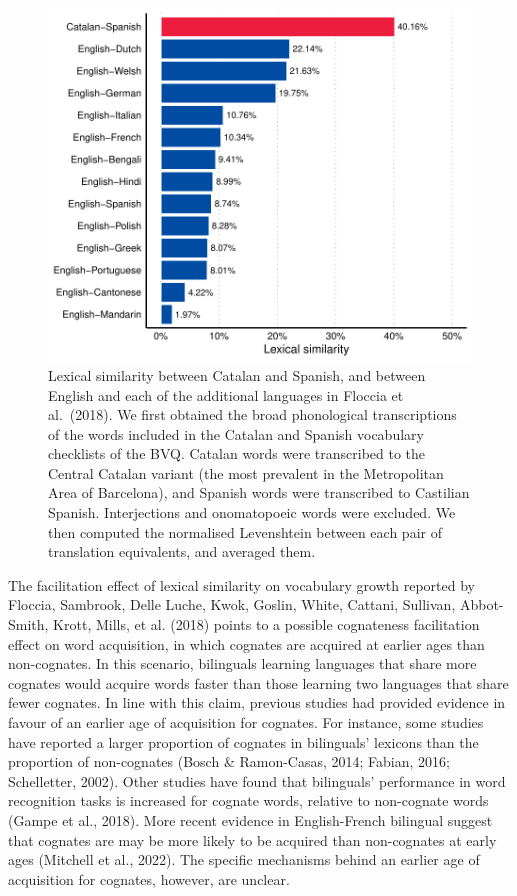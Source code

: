 \documentclass[
  12pt,
  b5paperpaper,
  twoside]{scrreprt}
\begin{document}
\begin{figure}

{\centering \includegraphics{chapters/01-introduction_files/figure-pdf/fig-cat-spa-distance-1.pdf}

}

\caption{\label{fig-cat-spa-distance}Lexical similarity between Catalan
and Spanish, and between English and each of the additional languages in
Floccia et al.~(2018). We first obtained the broad phonological
transcriptions of the words included in the Catalan and Spanish
vocabulary checklists of the BVQ. Catalan words were transcribed to the
Central Catalan variant (the most prevalent in the Metropolitan Area of
Barcelona), and Spanish words were transcribed to Castilian Spanish.
Interjections and onomatopoeic words were excluded. We then computed the
normalised Levenshtein between each pair of translation equivalents, and
averaged them.}

\end{figure}

The facilitation effect of lexical similarity on vocabulary growth
reported by Floccia, Sambrook, Delle Luche, Kwok, Goslin, White,
Cattani, Sullivan, Abbot-Smith, Krott, Mills, et al. (2018) points to a
possible cognateness facilitation effect on word acquisition, in which
cognates are acquired at earlier ages than non-cognates. In this
scenario, bilinguals learning languages that share more cognates would
acquire words faster than those learning two languages that share fewer
cognates. In line with this claim, previous studies had provided
evidence in favour of an earlier age of acquisition for cognates. For
instance, some studies have reported a larger proportion of cognates in
bilinguals' lexicons than the proportion of non-cognates (Bosch \&
Ramon-Casas, 2014; Fabian, 2016; Schelletter, 2002). Other studies have
found that bilinguals' performance in word recognition tasks is
increased for cognate words, relative to non-cognate words (Gampe et
al., 2018). More recent evidence in English-French bilingual suggest
that cognates are may be more likely to be acquired than non-cognates at
early ages (Mitchell et al., 2022). The specific mechanisms behind an
earlier age of acquisition for cognates, however, are unclear.
\end{document}
